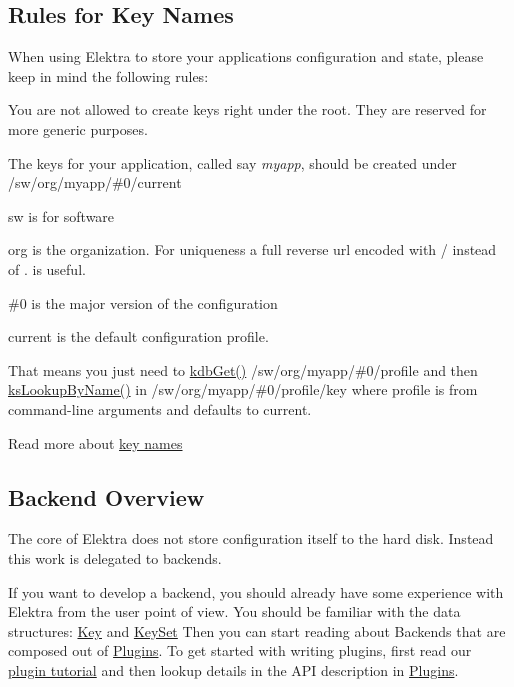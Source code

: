\subsection*{Rules for Key Names}

When using Elektra to store your application\textquotesingle{}s configuration and state, please keep in mind the following rules\+:


\begin{DoxyItemize}
\item You are not allowed to create keys right under the root. They are reserved for more generic purposes.
\item The keys for your application, called say {\itshape myapp}, should be created under {\ttfamily /sw/org/myapp/\#0/current}
\begin{DoxyItemize}
\item sw is for software
\item org is the organization. For uniqueness a full reverse url encoded with \textquotesingle{}/\textquotesingle{} instead of \textquotesingle{}.\textquotesingle{} is useful.
\item {\ttfamily \#0} is the major version of the configuration
\item current is the default configuration profile.
\item That means you just need to \hyperlink{group__kdb_ga28e385fd9cb7ccfe0b2f1ed2f62453a1}{kdb\+Get()} {\ttfamily /sw/org/myapp/\#0/profile} and then \hyperlink{group__keyset_gad2e30fb6d4739d917c5abb2ac2f9c1a1}{ks\+Lookup\+By\+Name()} in {\ttfamily /sw/org/myapp/\#0/profile/key} where profile is from command-\/line arguments and defaults to current.
\end{DoxyItemize}
\end{DoxyItemize}

Read more about \hyperlink{doc_help_elektra-key-names_md}{key names}

\subsection*{Backend Overview}

The core of Elektra does not store configuration itself to the hard disk. Instead this work is delegated to backends.

If you want to develop a backend, you should already have some experience with Elektra from the user point of view. You should be familiar with the data structures\+: \hyperlink{group__key}{Key} and \hyperlink{group__keyset}{Key\+Set} Then you can start reading about Backends that are composed out of \hyperlink{group__plugin}{Plugins}. To get started with writing plugins, first read our \hyperlink{doc_tutorials_plugins_md}{plugin tutorial} and then lookup details in the A\+PI description in \hyperlink{group__plugin}{Plugins}.

